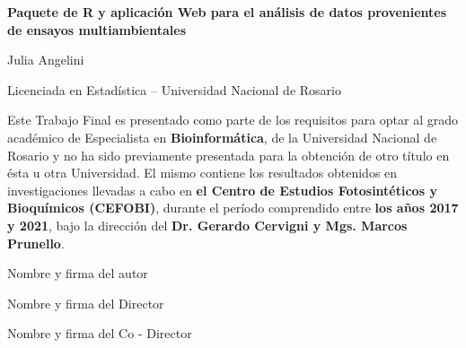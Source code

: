
\begin{center}
\textbf{\Large{Paquete de R y aplicación Web para el análisis de datos provenientes de ensayos multiambientales}}
\end{center}

\vspace{1.5cm}

\begin{center}
Julia Angelini

\vspace{0.5cm}
Licenciada en Estadística – Universidad Nacional de Rosario
\end{center}
\vspace{1.5cm}
Este Trabajo Final es presentado como parte de los requisitos para optar al grado académico de Especialista en \textbf{Bioinformática}, de la Universidad Nacional de Rosario y no ha sido previamente presentada para la obtención de otro título en ésta u otra Universidad. El mismo contiene los resultados obtenidos en investigaciones llevadas a cabo en \textbf{el Centro de Estudios Fotosintéticos y Bioquímicos (CEFOBI)}, durante el período comprendido entre \textbf{los años 2017 y 2021}, bajo la dirección del \textbf{Dr. Gerardo Cervigni y Mgs. Marcos Prunello}.  

\vspace{1.25cm}
Nombre y firma del autor

\vspace{1.25cm}
Nombre y firma del Director
 
\vspace{1.25cm}
Nombre y firma del Co - Director

\vspace{2.5cm}



